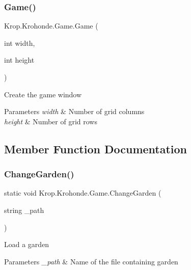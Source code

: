 \subsubsection{\texorpdfstring{Game()}{Game()}}
{\footnotesize\ttfamily Krop.\+Krohonde.\+Game.\+Game (\begin{DoxyParamCaption}\item[{int}]{width,  }\item[{int}]{height }\end{DoxyParamCaption})}



Create the game window 


\begin{DoxyParams}{Parameters}
{\em width} & Number of grid columns\\
\hline
{\em height} & Number of grid rows\\
\hline
\end{DoxyParams}


\subsection{Member Function Documentation}
\mbox{\label{class_krop_1_1_krohonde_1_1_game_ac51d3346621871ac6d5d7faff715a067}} 
\subsubsection{\texorpdfstring{Change\+Garden()}{ChangeGarden()}\hspace{0.1cm}{\footnotesize\ttfamily [1/2]}}
{\footnotesize\ttfamily static void Krop.\+Krohonde.\+Game.\+Change\+Garden (\begin{DoxyParamCaption}\item[{string}]{\+\_\+path }\end{DoxyParamCaption})\hspace{0.3cm}{\ttfamily [static]}}



Load a garden 


\begin{DoxyParams}{Parameters}
{\em \+\_\+path} & Name of the file containing garden \\
\hline
\end{DoxyParams}
\mbox{\label{class_krop_1_1_krohonde_1_1_game_ad89cd94c1649b695992d56fc9da54f35}} 
